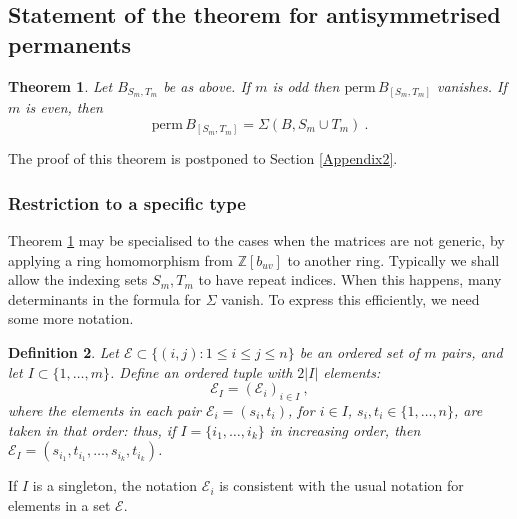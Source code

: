 \documentclass[10pt]{amsart}
\newcommand{\ZZ}{{\mathbb Z}}
\newcommand{\sE}{\mathcal{E}}
\newcommand{\perm}{\mathrm{perm}\,}
\theoremstyle{plain}
\newtheorem{thm}{Theorem}
\newtheorem{defn}[thm]{Definition}
\newcommand{\0}{\color{blue}{\mathsf{0}}}
\begin{document}
\subsection{Statement of the theorem for antisymmetrised permanents}

\begin{thm} \label{thm: PermSigmaGeneric} Let $B_{S_m,T_m}$ be as above. If $m$ is odd then $\perm B_{[S_m,T_m]}$ vanishes. If $m$ is even, then 
\begin{equation} \label{genericPermasSigma} \perm B_{[S_m,T_m]} =  \Sigma(B,S_m\cup T_m)\ . \end{equation}
\end{thm}
The proof of this theorem is postponed to Section \ref{Appendix2}. 

\subsubsection{Restriction to a specific type}  Theorem \ref{thm: PermSigmaGeneric} may be specialised to the cases when the matrices are not generic, by applying a ring homomorphism from $\ZZ[b_{uv}]$ to another ring. Typically we shall allow the indexing sets $S_{m},T_{m}$ to have repeat indices. When this happens, many determinants in the formula for $\Sigma$ vanish.  To express this efficiently, we need some more notation. 

\begin{defn} \label{defn: sE} Let $\sE\subset \{(i,j): 1\leq i\leq j\leq n\}$ be an ordered set of $m$ pairs, and let $I \subset \{1,\ldots, m\}$. Define an ordered tuple with $2|I|$ elements:
\[ \sE_I = ( \sE_{i})_{i\in I}\ ,\]
where the elements in each pair $\sE_i=(s_i,t_i)$, for $i \in I$, $s_i,t_i\in\{1,\ldots,n\}$, are taken in that order: thus, if $I=\{i_1,\ldots, i_k\}$ in increasing order, then  $\sE_I=(s_{i_1},t_{i_1},\ldots, s_{i_k},t_{i_k})$.
\end{defn}

If $I$ is a singleton, the notation $\sE_i$ is consistent with the usual notation for elements in a set $\sE$. 
\end{document}
